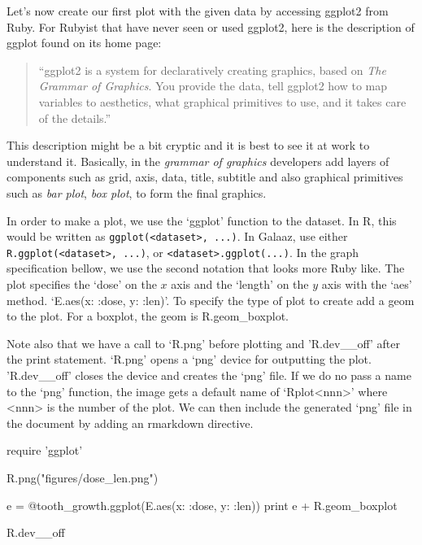 \documentclass[11pt,]{article}
\newenvironment{Shaded}{\begin{snugshade}}{\end{snugshade}}
\newcommand{\StringTok}[1]{\textcolor[rgb]{0.31,0.60,0.02}{#1}}
\newcommand{\OtherTok}[1]{\textcolor[rgb]{0.56,0.35,0.01}{#1}}
\newcommand{\NormalTok}[1]{#1}
\begin{document}
Let's now create our first plot with the given data by accessing ggplot2
from Ruby. For Rubyist that have never seen or used ggplot2, here is the
description of ggplot found on its home page:

\begin{quote}
``ggplot2 is a system for declaratively creating graphics, based on
\emph{The Grammar of Graphics}. You provide the data, tell ggplot2 how
to map variables to aesthetics, what graphical primitives to use, and it
takes care of the details.''
\end{quote}

This description might be a bit cryptic and it is best to see it at work
to understand it. Basically, in the \emph{grammar of graphics}
developers add layers of components such as grid, axis, data, title,
subtitle and also graphical primitives such as \emph{bar plot},
\emph{box plot}, to form the final graphics.

In order to make a plot, we use the `ggplot' function to the dataset. In
R, this would be written as
\texttt{ggplot(\textless{}dataset\textgreater{},\ ...)}. In Galaaz, use
either \texttt{R.ggplot(\textless{}dataset\textgreater{},\ ...)}, or
\texttt{\textless{}dataset\textgreater{}.ggplot(...)}. In the graph
specification bellow, we use the second notation that looks more Ruby
like. The plot specifies the `dose' on the \(x\) axis and the `length'
on the \(y\) axis with the `aes' method. `E.aes(x: :dose, y: :len)'. To
specify the type of plot to create add a geom to the plot. For a
boxplot, the geom is R.geom\_boxplot.

Note also that we have a call to `R.png' before plotting and
'R.dev\_\_off' after the print statement. `R.png' opens a `png' device
for outputting the plot. 'R.dev\_\_off' closes the device and creates
the `png' file. If we do no pass a name to the `png' function, the image
gets a default name of `Rplot\textless{}nnn\textgreater{}' where
\textless{}nnn\textgreater{} is the number of the plot. We can then
include the generated `png' file in the document by adding an rmarkdown
directive.

\begin{Shaded}
\begin{Highlighting}[]
\NormalTok{require }\StringTok{'ggplot'}

\NormalTok{R.png(}\StringTok{"figures/dose_len.png"}\NormalTok{)}

\NormalTok{e = }\OtherTok{@tooth_growth}\NormalTok{.ggplot(E.aes(}\StringTok{x: :dose}\NormalTok{, }\StringTok{y: :len}\NormalTok{))}
\NormalTok{print e + R.geom_boxplot}

\NormalTok{R.dev__off}
\end{Highlighting}
\end{Shaded}
\end{document}
